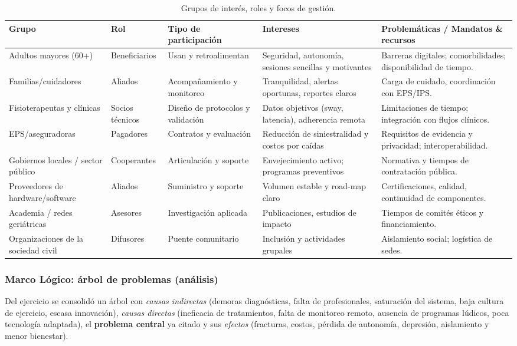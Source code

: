 \begin{table}[H]
\centering
\renewcommand{\arraystretch}{1.2}
\begin{tabular}{p{2.8cm} p{2cm} p{2.5cm} p{3.5cm} p{4.8cm}}
\toprule
\textbf{Grupo} & \textbf{Rol} & \textbf{Tipo de participación} & \textbf{Intereses} & \textbf{Problemáticas / Mandatos \& recursos} \\
\midrule
Adultos mayores (60+) & Beneficiarios & Usan y retroalimentan & Seguridad, autonomía, sesiones sencillas y motivantes & Barreras digitales; comorbilidades; disponibilidad de tiempo. \\
Familias/cuidadores & Aliados & Acompañamiento y monitoreo & Tranquilidad, alertas oportunas, reportes claros & Carga de cuidado, coordinación con EPS/IPS. \\
Fisioterapeutas y clínicas & Socios técnicos & Diseño de protocolos y validación & Datos objetivos (sway, latencia), adherencia remota & Limitaciones de tiempo; integración con flujos clínicos. \\
EPS/aseguradoras & Pagadores & Contratos y evaluación & Reducción de siniestralidad y costos por caídas & Requisitos de evidencia y privacidad; interoperabilidad. \\
Gobiernos locales / sector público & Cooperantes & Articulación y soporte & Envejecimiento activo; programas preventivos & Normativa y tiempos de contratación pública. \\
Proveedores de hardware/software & Aliados & Suministro y soporte & Volumen estable y road-map claro & Certificaciones, calidad, continuidad de componentes. \\
Academia / redes geriátricas & Asesores & Investigación aplicada & Publicaciones, estudios de impacto & Tiempos de comités éticos y financiamiento. \\
Organizaciones de la sociedad civil & Difusores & Puente comunitario & Inclusión y actividades grupales & Aislamiento social; logística de sedes. \\
\bottomrule
\end{tabular}
\caption{Grupos de interés, roles y focos de gestión.}
\end{table}

\subsubsection{Marco Lógico: árbol de problemas (análisis)}
Del ejercicio se consolidó un árbol con \textit{causas indirectas} (demoras diagnósticas, falta de profesionales, saturación del sistema, baja cultura de ejercicio, escasa innovación), \textit{causas directas} (ineficacia de tratamientos, falta de monitoreo remoto, ausencia de programas lúdicos, poca tecnología adaptada), el \textbf{problema central} ya citado y sus \textit{efectos} (fracturas, costos, pérdida de autonomía, depresión, aislamiento y menor bienestar). 

